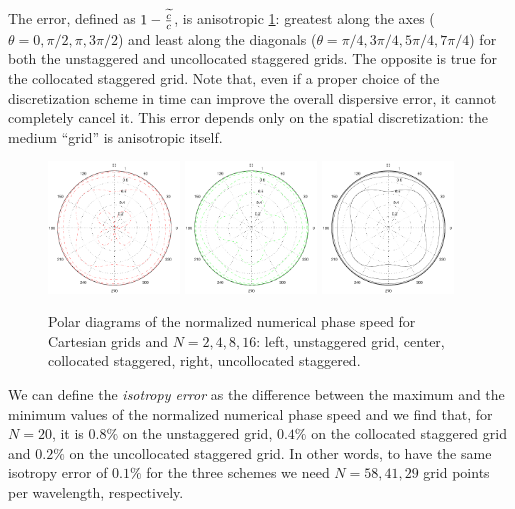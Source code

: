 The error, defined as $1 - \frac{\widetilde{c}}{c}$, is anisotropic
\ref{fig:numerical_c_polar}: greatest along the axes ($\theta = 0,
\pi/2, \pi, 3\pi/2$) and least along the diagonals ($\theta = \pi/4,
3\pi/4, 5\pi/4, 7\pi/4$) for both the unstaggered and uncollocated
staggered grids. The opposite is true for the collocated staggered
grid. Note that, even if a proper choice of the discretization scheme
in time can improve the overall dispersive error, it cannot completely
cancel it. This error depends only on the spatial discretization: the
medium ``grid'' is anisotropic itself.

\begin{figure}[htbp]
  \begin{center}
    \includegraphics[width=3.5cm]{pics/liu_fourier_fig2a}
    \includegraphics[width=3.5cm]{pics/liu_fourier_fig2b}
    \includegraphics[width=3.5cm]{pics/liu_fourier_fig2c}
  \end{center}
  \caption{Polar diagrams of the normalized numerical phase speed for
  Cartesian grids and $N = 2, 4, 8, 16$: left, unstaggered grid,
  center, collocated staggered, right, uncollocated staggered.}
  \label{fig:numerical_c_polar}
\end{figure}  

We can define the \emph{isotropy error} as the difference between the
maximum and the minimum values of the normalized numerical phase speed
and we find that, for $N = 20$, it is $0.8\%$ on the unstaggered grid,
$0.4\%$ on the collocated staggered grid and $0.2\%$ on the uncollocated
staggered grid. In other words, to have the same isotropy error of
$0.1\%$ for the three schemes we need $N = 58, 41, 29$ grid points per
wavelength, respectively.

